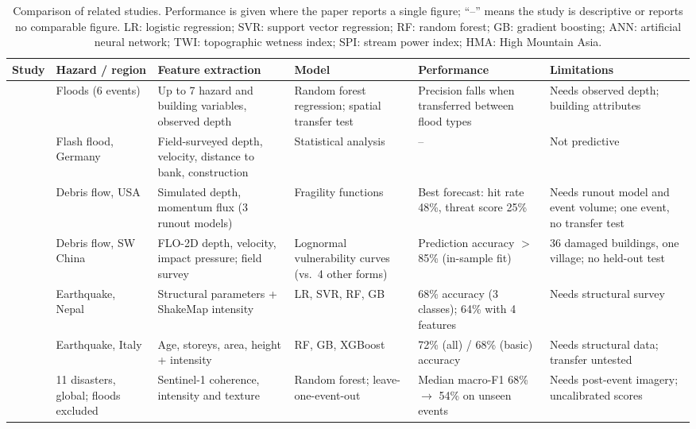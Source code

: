 \documentclass[journal,a4paper]{IEEEtran}
\begin{document}
\begin{table}[tp]
\centering\footnotesize
\setlength{\tabcolsep}{3pt}
\caption{Comparison of related studies. Performance is given where the paper reports a single figure; ``--'' means the study is descriptive or reports no comparable figure. LR: logistic regression; SVR: support vector regression; RF: random forest; GB: gradient boosting; ANN: artificial neural network; TWI: topographic wetness index; SPI: stream power index; HMA: High Mountain Asia.}\label{tab:lit}
\begin{tabularx}{\textwidth}{@{}L{2.3cm}L{2.2cm}L{3.6cm}L{2.7cm}L{2.6cm}Y@{}}
\toprule
\textbf{Study} & \textbf{Hazard / region} & \textbf{Feature extraction} & \textbf{Model} & \textbf{Performance} & \textbf{Limitations}\\
\midrule
\citet{paulik2023} & Floods (6 events) & Up to 7 hazard and building variables, observed depth & Random forest regression; spatial transfer test & Precision falls when transferred between flood types & Needs observed depth; building attributes\\
\citet{wuthrich2024} & Flash flood, Germany & Field-surveyed depth, velocity, distance to bank, construction & Statistical analysis & -- & Not predictive\\
\citet{barnhart2024} & Debris flow, USA & Simulated depth, momentum flux (3 runout models) & Fragility functions & Best forecast: hit rate 48\%, threat score 25\% & Needs runout model and event volume; one event, no transfer test\\
\citet{wang2026} & Debris flow, SW China & FLO-2D depth, velocity, impact pressure; field survey & Lognormal vulnerability curves (vs.\ 4 other forms) & Prediction accuracy $>$85\% (in-sample fit) & 36 damaged buildings, one village; no held-out test\\
\citet{ghimire2022} & Earthquake, Nepal & Structural parameters + ShakeMap intensity & LR, SVR, RF, GB & 68\% accuracy (3 classes); 64\% with 4 features & Needs structural survey\\
\citet{ghimire2023} & Earthquake, Italy & Age, storeys, area, height + intensity & RF, GB, XGBoost & 72\% (all) / 68\% (basic) accuracy & Needs structural data; transfer untested\\
\citet{currie2026} & 11 disasters, global; floods excluded & Sentinel-1 coherence, intensity and texture & Random forest; leave-one-event-out & Median macro-F1 68\% $\rightarrow$ 54\% on unseen events & Needs post-event imagery; uncalibrated scores\\

\end{tabularx}
\end{table}
\end{document}
